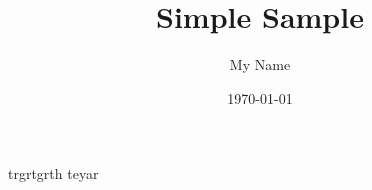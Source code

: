 \documentclass{thesis}
\title{Simple Sample}
\author{My Name}
\date{\today}
\begin{document}
trgrtgrth teyar
\end{document}
